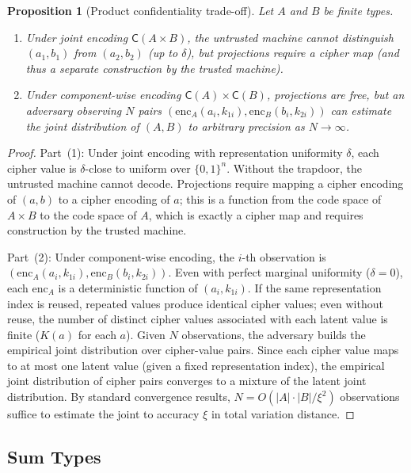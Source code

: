 \documentclass[11pt]{article}
\theoremstyle{definition}
\theoremstyle{plain}
\newtheorem{proposition}[theorem]{Proposition}
\theoremstyle{remark}
\newcommand{\enc}{\mathrm{enc}}
\newcommand{\cipher}[1]{\mathsf{C}(#1)}
\newcommand{\B}{\{0,1\}}
\begin{document}
\begin{proposition}[Product confidentiality trade-off]
\label{prop:product-tradeoff}
Let $A$ and $B$ be finite types.
\begin{enumerate}
\item Under joint encoding $\cipher{A \times B}$, the untrusted machine
  cannot distinguish $(a_1, b_1)$ from $(a_2, b_2)$ (up to $\delta$),
  but projections require a cipher map (and thus a separate construction
  by the trusted machine).
\item Under component-wise encoding $\cipher{A} \times \cipher{B}$,
  projections are free, but an adversary observing $N$ pairs
  $(\enc_A(a_i, k_{1i}), \enc_B(b_i, k_{2i}))$ can estimate the joint
  distribution of $(A, B)$ to arbitrary precision as $N \to \infty$.
\end{enumerate}
\end{proposition}

\begin{proof}
Part~(1): Under joint encoding with representation uniformity $\delta$,
each cipher value is $\delta$-close to uniform over $\B^n$.
Without the trapdoor, the untrusted machine cannot decode.
Projections require mapping a cipher encoding of $(a,b)$ to a cipher
encoding of $a$; this is a function from the code space of $A \times B$ to
the code space of $A$, which is exactly a cipher map and requires
construction by the trusted machine.

Part~(2): Under component-wise encoding, the $i$-th observation is
$(\enc_A(a_i, k_{1i}),\allowbreak \enc_B(b_i, k_{2i}))$.
Even with perfect marginal uniformity ($\delta = 0$), each $\enc_A$ is a
deterministic function of $(a_i, k_{1i})$.
If the same representation index is reused, repeated values produce
identical cipher values; even without reuse, the number of distinct cipher
values associated with each latent value is finite ($K(a)$ for each $a$).
Given $N$ observations, the adversary builds the empirical joint distribution
over cipher-value pairs.
Since each cipher value maps to at most one latent value (given a fixed
representation index), the empirical joint distribution of cipher pairs
converges to a mixture of the latent joint distribution.
By standard convergence results, $N = O(|A| \cdot |B| / \xi^2)$
observations suffice to estimate the joint to accuracy $\xi$ in total
variation distance.
\end{proof}


\subsection{Sum Types}
\label{sec:sums}
\end{document}
